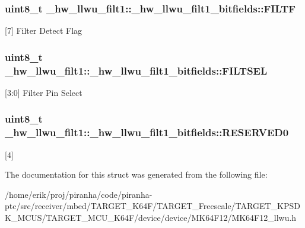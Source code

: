 \subsubsection[{\texorpdfstring{F\+I\+L\+TF}{FILTF}}]{\setlength{\rightskip}{0pt plus 5cm}uint8\+\_\+t \+\_\+hw\+\_\+llwu\+\_\+filt1\+::\+\_\+hw\+\_\+llwu\+\_\+filt1\+\_\+bitfields\+::\+F\+I\+L\+TF}\hypertarget{struct__hw__llwu__filt1_1_1__hw__llwu__filt1__bitfields_ad8512ac49e8cc5a14cf4cb03d7868e9b}{}\label{struct__hw__llwu__filt1_1_1__hw__llwu__filt1__bitfields_ad8512ac49e8cc5a14cf4cb03d7868e9b}
\mbox{[}7\mbox{]} Filter Detect Flag 
\subsubsection[{\texorpdfstring{F\+I\+L\+T\+S\+EL}{FILTSEL}}]{\setlength{\rightskip}{0pt plus 5cm}uint8\+\_\+t \+\_\+hw\+\_\+llwu\+\_\+filt1\+::\+\_\+hw\+\_\+llwu\+\_\+filt1\+\_\+bitfields\+::\+F\+I\+L\+T\+S\+EL}\hypertarget{struct__hw__llwu__filt1_1_1__hw__llwu__filt1__bitfields_a6a6546d535e0fbb2af24f93571a42c05}{}\label{struct__hw__llwu__filt1_1_1__hw__llwu__filt1__bitfields_a6a6546d535e0fbb2af24f93571a42c05}
\mbox{[}3\+:0\mbox{]} Filter Pin Select 
\subsubsection[{\texorpdfstring{R\+E\+S\+E\+R\+V\+E\+D0}{RESERVED0}}]{\setlength{\rightskip}{0pt plus 5cm}uint8\+\_\+t \+\_\+hw\+\_\+llwu\+\_\+filt1\+::\+\_\+hw\+\_\+llwu\+\_\+filt1\+\_\+bitfields\+::\+R\+E\+S\+E\+R\+V\+E\+D0}\hypertarget{struct__hw__llwu__filt1_1_1__hw__llwu__filt1__bitfields_a2a04eefbee21b8f75345ea1af2353395}{}\label{struct__hw__llwu__filt1_1_1__hw__llwu__filt1__bitfields_a2a04eefbee21b8f75345ea1af2353395}
\mbox{[}4\mbox{]} 

The documentation for this struct was generated from the following file\+:\begin{DoxyCompactItemize}
\item 
/home/erik/proj/piranha/code/piranha-\/ptc/src/receiver/mbed/\+T\+A\+R\+G\+E\+T\+\_\+\+K64\+F/\+T\+A\+R\+G\+E\+T\+\_\+\+Freescale/\+T\+A\+R\+G\+E\+T\+\_\+\+K\+P\+S\+D\+K\+\_\+\+M\+C\+U\+S/\+T\+A\+R\+G\+E\+T\+\_\+\+M\+C\+U\+\_\+\+K64\+F/device/device/\+M\+K64\+F12/M\+K64\+F12\+\_\+llwu.\+h\end{DoxyCompactItemize}
